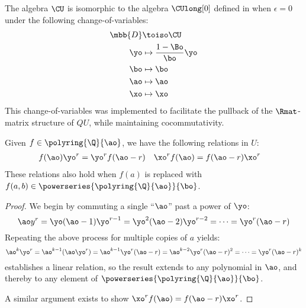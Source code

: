 \begin{remark}
        The algebra $\CU$ is isomorphic to the algebra $\CUlong[0]$ defined in
        \cite[§4]{BV23} when $ϵ=0$ under the following change-of-variables:
        \begin{equation}
                \begin{aligned}
                        \mbb{D} &\toiso \CU\\
                        \yo     &\mapsto \frac{1-\Bo}{\bo}\yo\\
                        \bo     &\mapsto \bo\\
                        \ao     &\mapsto \ao\\
                        \xo     &\mapsto \xo
                \end{aligned}
        \end{equation}
        This change-of-variables was implemented to facilitate the pullback of
        the $\Rmat$-matrix structure of $QU$, while maintaining cocommutativity.
\end{remark}

\begin{lemma}\label{lem:xay_relations}
        Given $f\in \polyring{\Q}{\ao}$, we have the
        following relations in $U$:
        \begin{align}\label{eq:xay_relations}
                f(\ao)\yo^r &= \yo^rf(\ao-r) &
                \xo^rf(\ao) &= f(\ao-r)\xo^r
        \end{align}
        These relations also hold when $f(a)$ is replaced with
        $f(a, b)\in \powerseries{\polyring{\Q}{\ao}}{\bo}$.
\end{lemma}
\begin{proof}
        We begin by commuting a single \enquote{$\ao$} past a power of $\yo$:
        \begin{equation}
                \ao y^r
                =\yo(\ao-1)\yo^{r-1}
                =\yo^2(\ao-2)\yo^{r-2}
                =\dots
                =\yo^{r}(\ao-r)
        \end{equation}
        Repeating the above process for multiple copies of $a$ yields:
        \begin{equation}\label{eq:ay_relation_monomial}
                \ao^k\yo^r
                =\ao^{k-1}(\ao \yo^r)
                =\ao^{k-1}\yo^r(\ao-r)
                =\ao^{k-2}\yo^r(\ao-r)^2
                =\dots
                =\yo^r(\ao-r)^k
        \end{equation}
         establishes a linear relation, so the
        result extends to any polynomial in $\ao$, and thereby to any element of
        $\powerseries{\polyring{\Q}{\ao}}{\bo}$.

        A similar argument exists to show $\xo^rf(\ao) = f(\ao-r)\xo^r$.
\end{proof}

